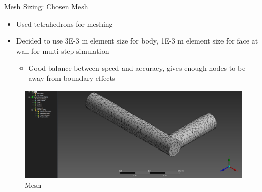 \documentclass[11pt]{beamer}
\begin{document}
    \begin{frame}{Mesh Sizing: Chosen Mesh}
       \begin{itemize} 
           \item Used tetrahedrons for meshing 
            \item Decided to use 3E-3 m element size for body, 1E-3 m element size for face at wall for multi-step simulation
            \begin{itemize}
                \item Good balance between speed and accuracy, gives enough nodes to be away from boundary effects
            \end{itemize}
        \end{itemize}

        \begin{figure}[H]
            \centering
            \vspace{-17pt}
            \includegraphics[scale=0.215]{figs/3E-3_Body_1E-3_Face/mesh_iso_ansys_cropped.png}
            \vspace{-20pt}
            \caption{Mesh}
        \end{figure}
    \end{frame}
\end{document}
